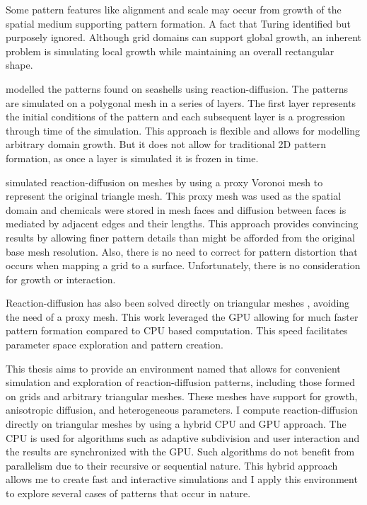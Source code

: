 Some pattern features like alignment and scale may occur from growth of the spatial medium supporting pattern formation. A fact that Turing identified but purposely ignored. Although grid domains can support global growth, an inherent problem is simulating local growth while maintaining an overall rectangular shape. 

\citet{fowler1992modeling} modelled the patterns found on seashells using reaction-diffusion. The patterns are simulated on a polygonal mesh in a series of layers. The first layer represents the initial conditions of the pattern and each subsequent layer is a progression through time of the simulation. This approach is flexible and allows for modelling arbitrary domain growth. But it does not allow for traditional 2D pattern formation, as once a layer is simulated it is frozen in time.

\citet{Turk1991} simulated reaction-diffusion on meshes by using a proxy Voronoi mesh to represent the original triangle mesh. This proxy mesh was used as the spatial domain and chemicals were stored in mesh faces and diffusion between faces is mediated by adjacent edges and their lengths. This approach provides convincing results by allowing finer pattern details than might be afforded from the original base mesh resolution. Also, there is no need to correct for pattern distortion that occurs when mapping a grid to a surface. Unfortunately, there is no consideration for growth or interaction. 

Reaction-diffusion has also been solved directly on triangular meshes \citep{Descombes2016}, avoiding the need of a proxy mesh. This work leveraged the GPU allowing for much faster pattern formation compared to CPU based computation. This speed facilitates parameter space exploration and pattern creation. 

This thesis aims to provide an environment named \ProgramName{} that allows for convenient simulation and exploration of reaction-diffusion patterns, including those formed on grids and arbitrary triangular meshes. These meshes have support for growth, anisotropic diffusion, and heterogeneous parameters. I compute reaction-diffusion directly on triangular meshes by using a hybrid CPU and GPU approach. The CPU is used for algorithms such as adaptive subdivision and user interaction and the results are synchronized with the GPU. Such algorithms do not benefit from parallelism due to their recursive or sequential nature. This hybrid approach allows me to create fast and interactive simulations and I apply this environment to explore several cases of patterns that occur in nature.

